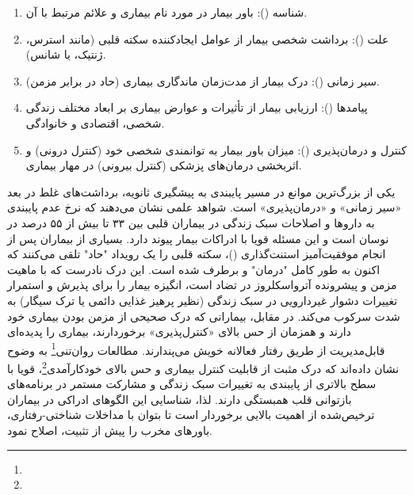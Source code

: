 \begin{enumerate}

\item شناسه (): باور بیمار در مورد نام بیماری و علائم مرتبط با آن.

\item علت (): برداشت شخصی بیمار از عوامل ایجادکننده سکته قلبی (مانند استرس، ژنتیک، یا شانس).

\item سیر زمانی (): درک بیمار از مدت‌زمان ماندگاری بیماری (حاد در برابر مزمن).

\item پیامدها (): ارزیابی بیمار از تأثیرات و عوارض بیماری بر ابعاد مختلف زندگی شخصی، اقتصادی و خانوادگی.

\item کنترل و درمان‌پذیری (): میزان باور بیمار به توانمندی شخصی خود (کنترل درونی) و اثربخشی درمان‌های پزشکی (کنترل بیرونی) در مهار بیماری\cite{Leventhal2016CSM,French2006CardiacRehab}.

\end{enumerate}

یکی از بزرگ‌ترین موانع در مسیر پایبندی به پیشگیری ثانویه، برداشت‌های غلط در بعد «سیر زمانی» و «درمان‌پذیری» است. شواهد علمی نشان می‌دهند که نرخ عدم پایبندی به داروها و اصلاحات سبک زندگی در بیماران قلبی بین ۳۳ تا بیش از ۵۵ درصد در نوسان است و این مسئله قویا با ادراکات بیمار پیوند دارد\cite{Mobini2023IllnessPerception}. بسیاری از بیماران پس از انجام موفقیت‌آمیز استنت‌گذاری ()، سکته قلبی را یک رویداد "حاد" تلقی می‌کنند که اکنون به طور کامل "درمان" و برطرف شده است\cite{French2006CardiacRehab}. این درک نادرست که با ماهیت مزمن و پیشرونده آترواسکلروز در تضاد است، انگیزه بیمار را برای پذیرش و استمرار تغییرات دشوار غیردارویی در سبک زندگی (نظیر پرهیز غذایی دائمی یا ترک سیگار) به شدت سرکوب می‌کند. در مقابل، بیمارانی که درک صحیحی از مزمن بودن بیماری خود دارند و همزمان از حس بالای «کنترل‌پذیری» برخوردارند، بیماری را پدیده‌ای قابل‌مدیریت از طریق رفتار فعالانه خویش می‌پندارند. مطالعات روان‌تنی\footnote{} به وضوح نشان داده‌اند که درک مثبت از قابلیت کنترل بیماری و حس بالای خودکارآمدی\footnote{}، قویا با سطح بالاتری از پایبندی به تغییرات سبک زندگی و مشارکت مستمر در برنامه‌های بازتوانی قلب همبستگی دارند\cite{Mobini2023IllnessPerception,Aujla2016IllnessBeliefs}. لذا، شناسایی این الگوهای ادراکی در بیماران ترخیص‌شده از اهمیت بالایی برخوردار است تا بتوان با مداخلات شناختی-رفتاری، باورهای مخرب را پیش از تثبیت، اصلاح نمود\cite{Mobini2023IllnessPerception,Aujla2016IllnessBeliefs}.


